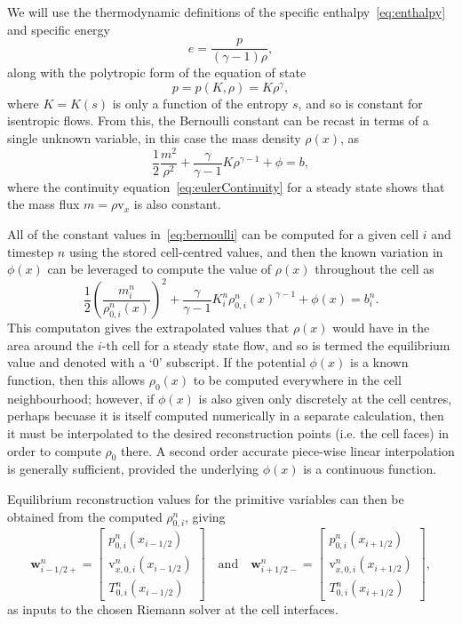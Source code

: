 We will use the thermodynamic definitions of the specific enthalpy~\eqref{eq:enthalpy} and specific energy
\begin{equation}
e=\frac{p}{(\gamma-1)\rho},
\end{equation}
along with the polytropic form of the equation of state
\begin{equation}
p=p(K,\rho)=K\rho^{\gamma},
\end{equation}
where $K=K(s)$ is only a function of the entropy $s$, and so is constant for isentropic flows. From this, the Bernoulli constant can be recast in terms of a single unknown variable, in this case the mass density $\rho(x)$, as
\begin{equation}
\frac{1}{2}\frac{m^2}{\rho^2}+\frac{\gamma}{\gamma-1}K\rho^{\gamma-1}+\phi=b, \label{eq:bernoulli}
\end{equation}
where the continuity equation~\eqref{eq:eulerContinuity} for a steady state shows that the mass flux $m=\rho \mathrm{v}_x$ is also constant.

All of the constant values in~\eqref{eq:bernoulli} can be computed for a given cell $i$ and timestep $n$ using the stored cell-centred values, and then the known variation in $\phi(x)$ can be leveraged to compute the value of $\rho(x)$ throughout the cell as
\begin{equation}
\frac{1}{2}\left(\frac{m_i^n}{\rho_{0,i}^n(x)}\right)^2+\frac{\gamma}{\gamma-1}K_i^n\rho_{0,i}^n(x)^{\gamma-1}+\phi(x)=b_i^n.
\end{equation}
This computaton gives the extrapolated values that $\rho(x)$ would have in the area around the $i\textrm{-th}$ cell for a steady state flow, and so is termed the equilibrium value and denoted with a `$0$' subscript. If the potential $\phi(x)$ is a known function, then this allows $\rho_0(x)$ to be computed everywhere in the cell neighbourhood; however, if $\phi(x)$ is also given only discretely at the cell centres, perhaps becuase it is itself computed numerically in a separate calculation, then it must be interpolated to the desired reconstruction points (i.e. the cell faces) in order to compute $\rho_0$ there. A second order accurate piece-wise linear interpolation is generally sufficient, provided the underlying $\phi(x)$ is a continuous function.

Equilibrium reconstruction values for the primitive variables can then be obtained from the computed $\rho_{0,i}^n$, giving
\begin{equation} \label{eq:primitives1D1}
\mathbf{w}_{i-1/2+}^n=
\begin{bmatrix}
p_{0,i}^n(x_{i-1/2}) \\ \mathrm{v}_{x,0,i}^n(x_{i-1/2}) \\ T_{0,i}^n(x_{i-1/2})
\end{bmatrix}
\quad \textrm{and} \quad \mathbf{w}_{i+1/2-}^n=
\begin{bmatrix}
p_{0,i}^n(x_{i+1/2}) \\ \mathrm{v}_{x,0,i}^n(x_{i+1/2}) \\ T_{0,i}^n(x_{i+1/2})
\end{bmatrix},
\end{equation}
as inputs to the chosen Riemann solver at the cell interfaces.

